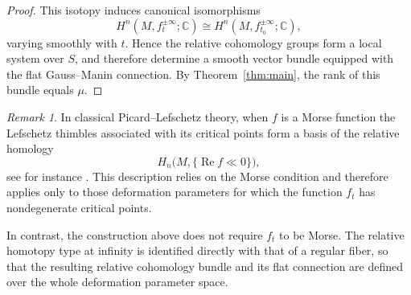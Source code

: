 \documentclass[11pt]{amsart}
\theoremstyle{plain}
\theoremstyle{definition}
\theoremstyle{remark}
\newtheorem{remark}[theorem]{Remark}
\numberwithin{equation}{section}
\begin{document}
\begin{proof}
    This isotopy induces canonical isomorphisms
    \begin{equation}
        H^n(M, f_t^{\pm\infty}; \mathbb{C}) \cong H^n(M, f_{t_0}^{\pm\infty}; \mathbb{C}),
    \end{equation}
    varying smoothly with $t$.
    Hence the relative cohomology groups form a local system over $S$, and therefore determine a smooth vector bundle equipped with the flat Gauss--Manin connection.
    By Theorem~\ref{thm:main}, the rank of this bundle equals $\mu$.
\end{proof}

\begin{remark}\label{rem:picard-lefschetz}
    In classical Picard--Lefschetz theory, when $f$ is a Morse function the Lefschetz thimbles associated with its critical points form a basis of the relative homology
    \begin{equation}
        H_n\bigl(M, \{\operatorname{Re} f \ll 0\}\bigr),
    \end{equation}
    see for instance \cite{milnor1968singular}.
    This description relies on the Morse condition and therefore applies only to those deformation parameters for which the function $f_t$ has nondegenerate critical points.

    In contrast, the construction above does not require $f_t$ to be Morse.
    The relative homotopy type at infinity is identified directly with that of a regular fiber, so that the resulting relative cohomology bundle and its flat connection are defined over the whole deformation parameter space.
\end{remark}

\nocite{arnold2012singularities,Batyrev1993,Broughton1988,CecottiVafa1991,CIR2014,Dubrovin1990ModernIII,dimca1992singularities,Dubrovin1993,Dubrovin1996,fan2011,FanFang2021,FanLanYang2020,FanJarvisRuan2013,GrauertRemmert2004,Hertling2003,Kulikov_1998,LeDungTrang1977,LI2022108165,Marsh2013TheBC,milnor1963morse,milnor1968singular,saito1989brieskorn,Saito1981Primitive,SaitoTakahashi2008,Wen2016,WenFan2015}
\printbibliography
\end{document}
